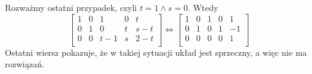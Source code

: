 \documentclass[]{sinol}
\begin{document}
\begin{zadanie}
        Rozważmy ostatni przypadek, czyli $t=1 \land s=0$. Wtedy 
        \[
        \begin{bmatrix}
            1 & 0 & 1 & 0 & t \\
            0 & 1 & 0 & t & s-t \\
            0 & 0 & t-1 & s & 2-t \\
        \end{bmatrix}  
        \Leftrightarrow
        \begin{bmatrix}
            1 & 0 & 1 & 0 & 1 \\
            0 & 1 & 0 & 1 & -1 \\
            0 & 0 & 0 & 0 & 1 \\
        \end{bmatrix}        
        \]
        Ostatni wiersz pokazuje, że w takiej sytuacji układ jest sprzeczny, a więc nie ma rozwiązań.
    \end{zadanie}
\end{document}
